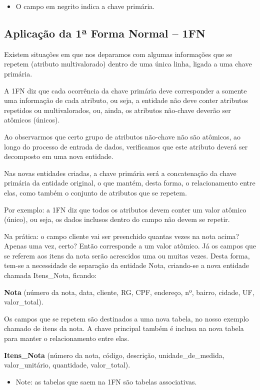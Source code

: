 \documentclass{article}
\begin{document}
\begin{itemize}
    \item O campo em negrito indica a chave primária.
\end{itemize}

\subsection*{Aplicação da 1ª Forma Normal – 1FN}
Existem situações em que nos deparamos com algumas informações que se repetem (atributo multivalorado) dentro de uma única linha, ligada a uma chave primária.

A 1FN diz que cada ocorrência da chave primária deve corresponder a somente uma informação de cada atributo, ou seja, a entidade não deve conter atributos repetidos ou multivalorados, ou, ainda, os atributos não-chave deverão ser atômicos (únicos).

Ao observarmos que certo grupo de atributos não-chave não são atômicos, ao longo do processo de entrada de dados, verificamos que este atributo deverá ser decomposto em uma nova entidade.

Nas novas entidades criadas, a chave primária será a concatenação da chave primária da entidade original, o que mantém, desta forma, o relacionamento entre elas, como também o conjunto de atributos que se repetem.

Por exemplo: a 1FN diz que todos os atributos devem conter um valor atômico (único), ou seja, os dados inclusos dentro do campo não devem se repetir. 

Na prática: o campo cliente vai ser preenchido quantas vezes na nota acima? Apenas uma vez, certo? Então corresponde a um valor atômico. Já os campos que se referem aos itens da nota serão acrescidos uma ou muitas vezes. Desta forma, tem-se a necessidade de separação da entidade Nota, criando-se a nova entidade chamada Itens\_Nota, ficando: 

\textbf{Nota} (número da nota, data, cliente, RG, CPF, endereço, nº, bairro, cidade, UF, valor\_total).

Os campos que se repetem são destinados a uma nova tabela, no nosso exemplo chamado de itens da nota. A chave principal também é inclusa na nova tabela para manter o relacionamento entre elas.

\textbf{Itens\_Nota} (número da nota, código, descrição, unidade\_de\_medida, valor\_unitário, quantidade, valor\_total).

\begin{itemize}
    \item Note: as tabelas que saem na 1FN são tabelas associativas.
\end{itemize}
\end{document}
